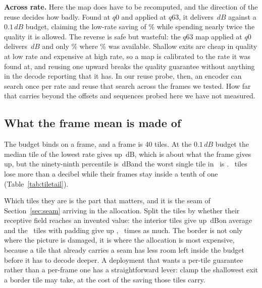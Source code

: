 \documentclass[10pt,twocolumn,letterpaper]{article}
\newcommand{\dB}{\,dB}
\begin{document}
\textbf{Across rate.} Here the map does have to be recomputed, and the direction
of the reuse decides how badly. Found at $q0$ and applied at $q63$, it delivers
\TransferCrossDb$\dB$ against a $0.1\dB$ budget, claiming the low-rate saving of
\TransferSaving\% while spending nearly twice the quality it is allowed. The
reverse is safe but wasteful: the $q63$ map applied at $q0$ delivers
\TransferBackDb$\dB$ and only \TransferBackSaving\% where \ClassLowUvg\% was available. Shallow exits are cheap in
quality at low rate and expensive at high rate, so a map is calibrated to the
rate it was found at, and reusing one upward breaks the quality guarantee
without anything in the decode reporting that it has. In our reuse probe, then, an encoder can search once per rate and reuse that
search across the frames we tested. How far that carries beyond the offsets and
sequences probed here we have not measured.

\subsection{What the frame mean is made of}

The budget binds on a frame, and a frame is 40 tiles. At the $0.1\dB$ budget the
median tile of the lowest rate gives up \TailMedian\dB, which is about what the
frame gives up, but the ninety-ninth percentile is \TailPNinetyNine\dB and the worst
single tile in \TailNTiles\ is \TailMax. \TailOverOne\ tiles lose more than a
decibel while their frames stay inside a tenth of one
(Table~\ref{tab:tiletail}).

\begin{table}[t]
\centering

\caption{\textbf{The distribution behind the frame mean.} Per-tile loss against
the released decoder at the $0.1\dB$ budget, over every tile of every test
sequence.}
\label{tab:tiletail}
\end{table}

Which tiles they are is the part that matters, and it is the seam of
Section~\ref{sec:seam} arriving in the allocation. Split the tiles by whether
their receptive field reaches an invented value: the interior tiles give up
\TailInterior\dB on average and the \TailBorderN\ tiles with padding give up
\TailBorder, \TailBorderRatio\ times as much. The border is not only where the
picture is damaged, it is where the allocation is most expensive, because a tile
that already carries a seam has less room left inside the budget before it has to
decode deeper. A deployment that wants a per-tile guarantee rather than a
per-frame one has a straightforward lever: clamp the shallowest exit a border
tile may take, at the cost of the saving those tiles carry.
\end{document}

